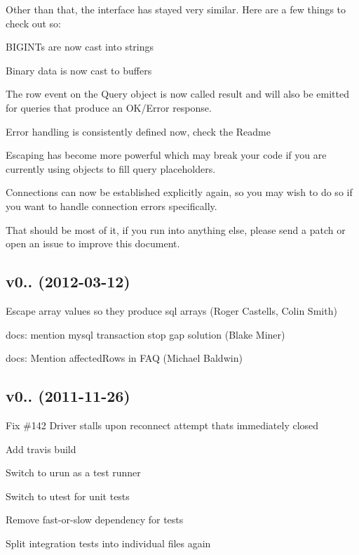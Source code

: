 Other than that, the interface has stayed very similar. Here are a few things to check out so\+:


\begin{DoxyItemize}
\item B\+I\+G\+I\+N\+T\textquotesingle{}s are now cast into strings
\item Binary data is now cast to buffers
\item The {\ttfamily \textquotesingle{}row\textquotesingle{}} event on the {\ttfamily Query} object is now called {\ttfamily \textquotesingle{}result\textquotesingle{}} and will also be emitted for queries that produce an O\+K/\+Error response.
\item Error handling is consistently defined now, check the Readme
\item Escaping has become more powerful which may break your code if you are currently using objects to fill query placeholders.
\item Connections can now be established explicitly again, so you may wish to do so if you want to handle connection errors specifically.
\end{DoxyItemize}

That should be most of it, if you run into anything else, please send a patch or open an issue to improve this document.

\subsection*{v0.. (2012-\/03-\/12)}


\begin{DoxyItemize}
\item Escape array values so they produce sql arrays (Roger Castells, Colin Smith)
\item docs\+: mention mysql transaction stop gap solution (Blake Miner)
\item docs\+: Mention affected\+Rows in F\+A\+Q (Michael Baldwin)
\end{DoxyItemize}

\subsection*{v0.. (2011-\/11-\/26)}


\begin{DoxyItemize}
\item Fix \#142 Driver stalls upon reconnect attempt that\textquotesingle{}s immediately closed
\item Add travis build
\item Switch to urun as a test runner
\item Switch to utest for unit tests
\item Remove fast-\/or-\/slow dependency for tests
\item Split integration tests into individual files again
\end{DoxyItemize}

